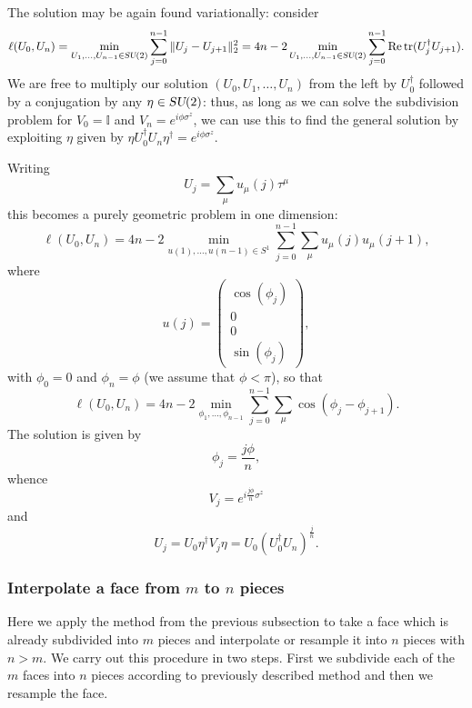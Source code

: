 \documentclass[12pt]{amsart}
\newcommand{\tr}{\operatorname{tr}}
\def\su2{\textsl{SU}(2)}
\theoremstyle{definition}
\theoremstyle{remark}
\numberwithin{equation}{section}
\begin{document}
The solution may be again found variationally: consider
\begin{equation}
	\ell(U_0, U_{n}) = \min_{U_1, \ldots, U_{n-1} \in \su2} \sum_{j=0}^{n-1} \|U_j-U_{j+1}\|_2^2 = 4n - 2\min_{U_1, \ldots, U_{n-1} \in \su2} \sum_{j=0}^{n-1}  \text{Re}\tr(U_j^\dag U_{j+1}).
\end{equation}
We are free to multiply our solution $(U_0, U_1, \ldots, U_{n})$ from the left by $U_0^\dag$ followed by a conjugation by any $\eta\in\su2$: thus, as long as we can solve the subdivision problem for $V_0 = \mathbb{I}$ and $V_{n} = e^{i\phi \sigma^z}$, we can use this to find the general solution by exploiting $\eta$ given by $\eta U_0^\dag U_{n} \eta^\dag = e^{i\phi \sigma^z}$.


Writing
\begin{equation}
	U_j = \sum_{\mu} u_\mu(j)\tau^\mu
\end{equation}
this becomes a purely geometric problem in one dimension:
\begin{equation}
	\ell(U_0, U_{n}) = 4n - 2 \min_{u(1), \ldots, u(n-1) \in S^1}  \sum_{j=0}^{n-1}\sum_{\mu} u_\mu(j)u_\mu(j+1),
\end{equation}
where 
\begin{equation}
	u(j) = \begin{pmatrix} \cos(\phi_j) \\ 0 \\ 0 \\ \sin(\phi_j)\end{pmatrix},
\end{equation}
with $\phi_0 = 0$ and $\phi_{n} = \phi$ (we assume that $\phi <\pi$),
so that
\begin{equation}
	\ell(U_0, U_{n}) = 4n - 2 \min_{\phi_1, \ldots, \phi_{n-1}}  \sum_{j=0}^{n-1}\sum_{\mu} \cos(\phi_j-\phi_{j+1}).
\end{equation}
The solution is given by
\begin{equation}
	\phi_j = \frac{j\phi}{n},
\end{equation}
whence
\begin{equation}
	V_j = e^{i\frac{j\phi}{n} \sigma^z}
\end{equation}
and
\begin{equation}
	U_j = U_0 \eta^\dag V_j \eta = U_0 (U_0^\dag U_{n})^{\frac{j}{n}}.
\end{equation}

\subsubsection{Interpolate a face from $m$ to $n$ pieces}
Here we apply the method from the previous subsection to take a face which is already subdivided into $m$ pieces and interpolate or resample it into $n$ pieces with $n>m$. We carry out this procedure in two steps. First we subdivide each of the $m$ faces into $n$ pieces according to previously described method and then we resample the face. 
\end{document}
